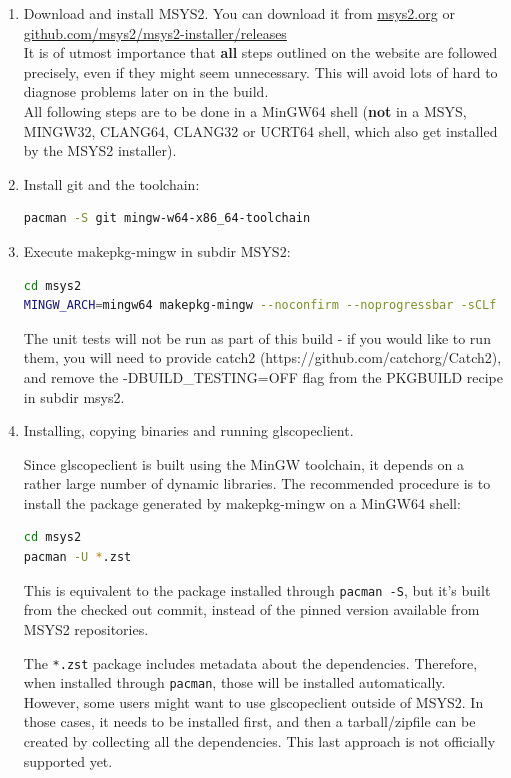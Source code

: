 \begin{enumerate}

\item Download and install MSYS2. You can download it from \href{https://www.msys2.org/}{msys2.org} or \href{https://github.com/msys2/msys2-installer/releases}{github.com/msys2/msys2-installer/releases}\\
It is of utmost importance that \textbf{all} steps outlined on the website are followed precisely, even if they might
seem unnecessary.
This will avoid lots of hard to diagnose problems later on in the build.\\

All following steps are to be done in a MinGW64 shell (\textbf{not} in a MSYS, MINGW32, CLANG64, CLANG32 or UCRT64 shell,
which also get installed by the MSYS2 installer).

\item Install git and the toolchain:

\begin{lstlisting}[language=sh]
pacman -S git mingw-w64-x86_64-toolchain
\end{lstlisting}

\item Execute makepkg-mingw in subdir MSYS2:

\begin{lstlisting}[language=sh]
cd msys2
MINGW_ARCH=mingw64 makepkg-mingw --noconfirm --noprogressbar -sCLf
\end{lstlisting}

The unit tests will not be run as part of this build - if you would like to run them, you will need to provide catch2 (https://github.com/catchorg/Catch2), and remove the -DBUILD\_TESTING=OFF flag from the PKGBUILD recipe in subdir msys2.

\item Installing, copying binaries and running glscopeclient.

Since glscopeclient is built using the MinGW toolchain, it depends on a rather large number of dynamic libraries.
The recommended procedure is to install the package generated by makepkg-mingw on a MinGW64 shell:

\begin{lstlisting}[language=sh]
cd msys2
pacman -U *.zst
\end{lstlisting}

This is equivalent to the package installed through \lstinline{pacman -S}, but it's built from the checked out commit,
instead of the pinned version available from MSYS2 repositories.

The \lstinline{*.zst} package includes metadata about the dependencies.
Therefore, when installed through \lstinline{pacman}, those will be installed automatically.
However, some users might want to use glscopeclient outside of MSYS2.
In those cases, it needs to be installed first, and then a tarball/zipfile can be created by collecting all the dependencies.
This last approach is not officially supported yet.

\end{enumerate}

